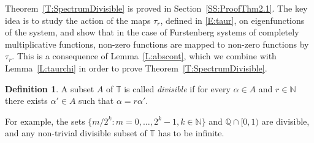 \documentclass[11pt]{amsart}
\theoremstyle{definition}
\newtheorem{definition}{Definition}[section]
\newcommand{\N}{{\mathbb N}}
\newcommand{\Q}{{\mathbb Q}}
\newcommand{\T}{{\mathbb T}}
\begin{document}
Theorem~\ref{T:SpectrumDivisible} is proved in Section~\ref{SS:ProofThm2.1}. The key idea is to study the action of the maps $\tau_r$, defined in \eqref{E:taur}, on eigenfunctions of the system, and show that in the case of Furstenberg systems of completely multiplicative functions, non-zero functions are mapped to non-zero functions by $\tau_r$. This is a consequence of Lemma~\ref{L:abscont}, which we combine with  Lemma~\ref{L:taurchi} in order to prove  Theorem~\ref{T:SpectrumDivisible}.

\begin{definition}
A subset $A$ of $\T$ is called {\em divisible}  if for every $\alpha\in A$ and  $r\in\N$ there exists $\alpha'\in  A$ such that $\alpha=r\alpha'$.
\end{definition}
For example,  the sets  $\{m/2^k\colon m=0,\ldots, 2^k-1, k\in \N \}$ and $\Q\cap [0,1)$ are divisible, and any non-trivial divisible subset of $\T$ has to be infinite.
\end{document}
